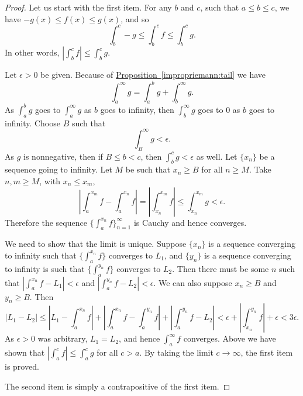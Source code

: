 \documentclass[12pt]{book}
\newcommand{\abs}[1]{\left\lvert {#1} \right\rvert}
\theoremstyle{plain}
\theoremstyle{remark}
\theoremstyle{definition}
\theoremstyle{exercise}
\theoremstyle{example}
\newcommand{\propref}[1]{\hyperref[#1]{Proposition~\ref*{#1}}}
\begin{document}
\begin{proof}
Let us start with the first item.
For any $b$ and $c$, such that $a \leq b \leq c$, we have 
$-g(x) \leq f(x) \leq g(x)$, and so
\begin{equation*}
\int_b^c -g \leq \int_b^c f \leq \int_b^c g  .
\end{equation*}
In other words, $\abs{\int_b^c f} \leq \int_b^c g$.

Let $\epsilon > 0$ be given.  Because
of \propref{impropriemann:tail} we have
\begin{equation*}
\int_a^\infty g =
\int_a^b g +
\int_b^\infty g .
\end{equation*}
As $\int_a^b g$ goes to
$\int_a^\infty g$ as $b$ goes to infinity, then
$\int_b^\infty g$ goes to 0 as $b$ goes to infinity.  Choose $B$
such that
\begin{equation*}
\int_B^\infty g < \epsilon .
\end{equation*}
As $g$ is nonnegative, then if $B \leq b < c$, then
$\int_b^c g < \epsilon$ as well.
Let $\{ x_n \}$ be a sequence going to infinity.  Let $M$ be such that
$x_n \geq B$ for all $n \geq M$.  Take $n, m \geq M$,
with $x_n \leq x_m$,
\begin{equation*}
\abs{\int_a^{x_m} f - \int_a^{x_n} f} 
=
\abs{\int_{x_n}^{x_m} f} 
\leq \int_{x_n}^{x_m} g < \epsilon .
\end{equation*}
Therefore the sequence $\{ \int_a^{x_n} f \}_{n=1}^\infty$ is Cauchy and hence converges.

We need to show that the limit is unique.  Suppose $\{ x_n \}$ is a sequence
converging to infinity such that
$\{ \int_a^{x_n} f \}$ converges to $L_1$, and $\{ y_n \}$ is a sequence
converging to infinity is such that
$\{ \int_a^{y_n} f \}$ converges to $L_2$.  Then there must be some $n$ such
that
$\abs{\int_a^{x_n} f - L_1} < \epsilon$ and 
$\abs{\int_a^{y_n} f - L_2} < \epsilon$.  We can also suppose $x_n \geq B$
and $y_n \geq B$.  Then
\begin{equation*}
\abs{L_1 - L_2} \leq
\abs{L_1 - \int_a^{x_n} f}
+
\abs{\int_a^{x_n} f- \int_a^{y_n} f}
+
\abs{\int_a^{y_n} f - L_2}
<
\epsilon
+
\abs{\int_{x_n}^{y_n} f}
+
\epsilon
<
3 \epsilon.
\end{equation*}
As $\epsilon > 0$ was arbitrary, $L_1 = L_2$, and hence
$\int_a^\infty f$ converges.
Above we have shown that $\abs{\int_a^c f} \leq \int_a^c g$ for all $c > a$.
By taking the limit $c \to \infty$, the first item is proved.

The second item is simply a contrapositive of the first item.
\end{proof}
\end{document}

